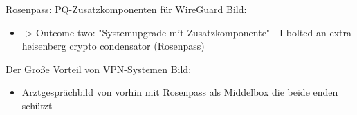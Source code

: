 
\begin{frame}[T]{Rosenpass: PQ-Zusatzkomponenten für WireGuard}
Bild:
\begin{itemize}
  \item -> Outcome two: "Systemupgrade mit Zusatzkomponente"
    - I bolted an extra heisenberg crypto condensator (Rosenpass)
\end{itemize}
\end{frame}

\begin{frame}[T]{Der Große Vorteil von VPN-Systemen}
Bild:
\begin{itemize}
  \item Arztgesprächbild von vorhin mit Rosenpass als Middelbox die beide enden schützt
\end{itemize}
\end{frame}

